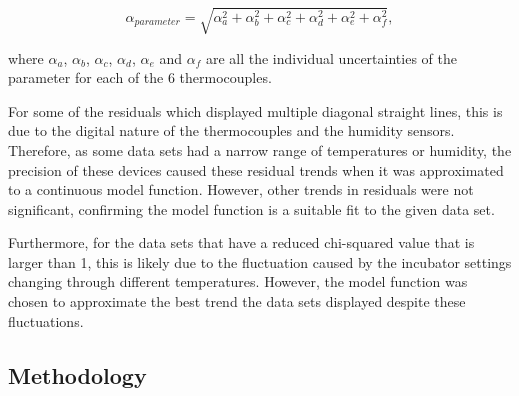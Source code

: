 \documentclass{article}
\begin{document}
\begin{equation}\label{ErrorEqn}
\alpha_{parameter} = \sqrt{\alpha_{a}^{2}+\alpha_{b}^{2}+\alpha_{c}^{2}+\alpha_{d}^{2}+\alpha_{e}^{2}+\alpha_{f}^{2}},
\end{equation}

where $\alpha_{a}$, $\alpha_{b}$, $\alpha_{c}$, $\alpha_{d}$, $\alpha_{e}$ and $\alpha_{f}$ are all the individual uncertainties of the parameter for each of the 6 thermocouples.

\vspace{3mm}

For some of the residuals which displayed multiple diagonal straight lines, this is due to the digital nature of the thermocouples and the humidity sensors. Therefore, as some data sets had a narrow range of temperatures or humidity, the precision of these devices caused these residual trends when it was approximated to a continuous model function.  However, other trends in residuals were not significant, confirming the model function is a suitable fit to the given data set.

\vspace{3mm}

Furthermore, for the data sets that have a reduced chi-squared value that is larger than 1, this is likely due to the fluctuation caused by the incubator settings changing through different temperatures. However, the model function was chosen to approximate the best trend the data sets displayed despite these fluctuations. 

\subsection{Methodology}
\end{document}
